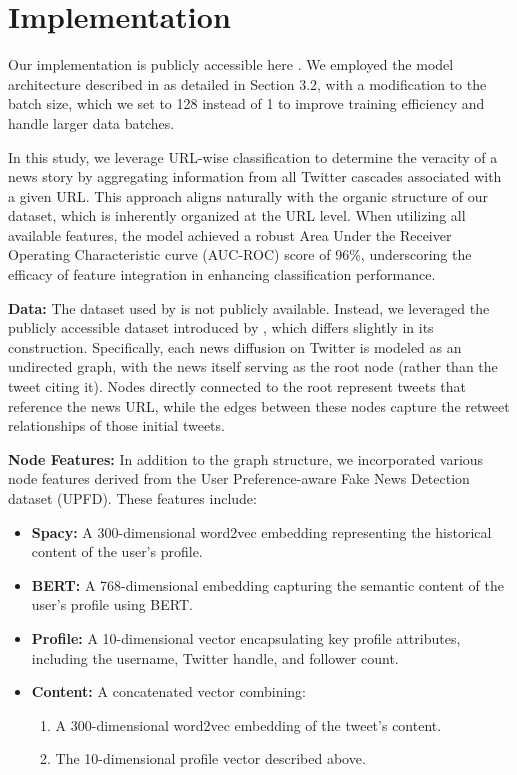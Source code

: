 \documentclass[sigconf,nonacm]{acmart}
\begin{document}
\section{Implementation}

Our implementation is publicly accessible here \cite{github}. We employed the model architecture described in \cite{monti2019fakenewsdetectionsocial} as detailed in Section 3.2, with a modification to the batch size, which we set to 128 instead of 1 to improve training efficiency and handle larger data batches.

In this study, we leverage URL-wise classification to determine the veracity of a news story by aggregating information from all Twitter cascades associated with a given URL. This approach aligns naturally with the organic structure of our dataset, which is inherently organized at the URL level. When utilizing all available features, the model achieved a robust Area Under the Receiver Operating Characteristic curve (AUC-ROC) score of 96\%, underscoring the efficacy of feature integration in enhancing classification performance.

\textbf{Data:} The dataset used by \cite{monti2019fakenewsdetectionsocial} is not publicly available. Instead, we leveraged the publicly accessible dataset introduced by \cite{10.1145/3404835.3462990}, which differs slightly in its construction. Specifically, each news diffusion on Twitter is modeled as an undirected graph, with the news itself serving as the root node (rather than the tweet citing it). Nodes directly connected to the root represent tweets that reference the news URL, while the edges between these nodes capture the retweet relationships of those initial tweets.

\textbf{Node Features:} In addition to the graph structure, we incorporated various node features derived from the User Preference-aware Fake News Detection dataset (UPFD). These features include:
\begin{itemize}
    \item \textbf{Spacy:} A 300-dimensional word2vec embedding representing the historical content of the user's profile.
    \item \textbf{BERT:} A 768-dimensional embedding capturing the semantic content of the user’s profile using BERT.
    \item \textbf{Profile:} A 10-dimensional vector encapsulating key profile attributes, including the username, Twitter handle, and follower count.
    \item \textbf{Content:} A concatenated vector combining:
    \begin{enumerate}
        \item A 300-dimensional word2vec embedding of the tweet's content.
        \item The 10-dimensional profile vector described above.
    \end{enumerate}
\end{itemize}
\end{document}
